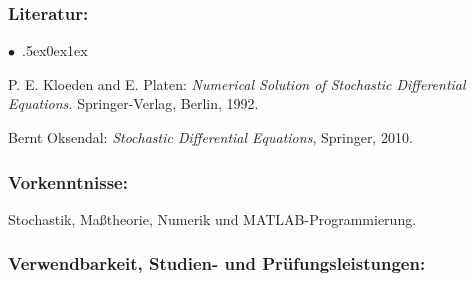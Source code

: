 \documentclass[a4paper,10pt]{article}
\renewenvironment{itemize}{\begin{list}{$\bullet$\ }{\itemsep.5ex\setlength{\topsep}{0.5\itemsep}\parsep0ex\labelsep1ex\settowidth{\labelwidth}{$\bullet$\ }\setlength{\leftmargin}{\labelwidth}\addtolength{\leftmargin}{3ex}\addtolength{\leftmargin}{\labelsep}}}{\end{list}}
\begin{document}
\subsubsection*{\large
    Literatur:
}
\begin{itemize}
\item
P. E. Kloeden and E. Platen: \emph{Numerical Solution of Stochastic Differential Equations.} Springer-Verlag, Berlin, 1992. 
\item
Bernt Oksendal: \emph{Stochastic Differential Equations}, Springer, 2010.
\end{itemize}
\subsubsection*{\large
    Vorkenntnisse:
}
Stochastik, Maßtheorie, Numerik und MATLAB-Programmierung.
\subsubsection*{\large
    Verwendbarkeit, Studien- und Prüfungsleistungen:
}
\end{document}
